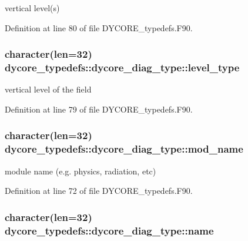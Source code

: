 vertical level(s) 



Definition at line 80 of file D\-Y\-C\-O\-R\-E\-\_\-typedefs.\-F90.

\subsubsection[{level\-\_\-type}]{\setlength{\rightskip}{0pt plus 5cm}character(len=32) dycore\-\_\-typedefs\-::dycore\-\_\-diag\-\_\-type\-::level\-\_\-type}\label{structdycore__typedefs_1_1dycore__diag__type_a5c500119b8307feb96268bf4b45a3d90}


vertical level of the field 



Definition at line 79 of file D\-Y\-C\-O\-R\-E\-\_\-typedefs.\-F90.

\subsubsection[{mod\-\_\-name}]{\setlength{\rightskip}{0pt plus 5cm}character(len=32) dycore\-\_\-typedefs\-::dycore\-\_\-diag\-\_\-type\-::mod\-\_\-name}\label{structdycore__typedefs_1_1dycore__diag__type_ab3879ca062dfe1cb6362f9397691b87b}


module name (e.\-g. physics, radiation, etc) 



Definition at line 72 of file D\-Y\-C\-O\-R\-E\-\_\-typedefs.\-F90.

\subsubsection[{name}]{\setlength{\rightskip}{0pt plus 5cm}character(len=32) dycore\-\_\-typedefs\-::dycore\-\_\-diag\-\_\-type\-::name}\label{structdycore__typedefs_1_1dycore__diag__type_a0fb804dacaaccb289ae3aabe1b445f31}


